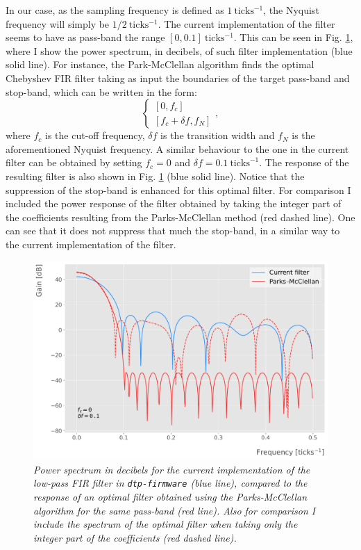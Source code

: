 In our case, as the sampling frequency is defined as $1 \ \mathrm{ticks^{-1}}$, the Nyquist frequency will simply be $1/2 \ \mathrm{ticks^{-1}}$. The current implementation of the filter seems to have as pass-band the range $[0,0.1] \ \mathrm{ticks^{-1}}$. This can be seen in Fig. \ref{fig:filter_comp}, where I show the power spectrum, in decibels, of such filter implementation (blue solid line). For instance, the Park-McClellan algorithm finds the optimal Chebyshev FIR filter taking as input the boundaries of the target pass-band and stop-band, which can be written in the form:
\begin{equation}
	\left\{ \begin{array}{c}
		\left[0, f_{c}\right] \\
		\left[ f_{c} + \delta f, f_{N}\right]
	\end{array} \right. ,
\end{equation}
where $f_{c}$ is the cut-off frequency, $\delta f$ is the transition width and $f_{N}$ is the aforementioned Nyquist frequency. A similar behaviour to the one in the current filter can be obtained by setting $f_{c} = 0$ and $\delta f = 0.1 \ \mathrm{ticks}^{-1}$. The response of the resulting filter is also shown in Fig. \ref{fig:filter_comp} (blue solid line). Notice that the suppression of the stop-band is enhanced for this optimal filter. For comparison I included the power response of the filter obtained by taking the integer part of the coefficients resulting from the Parks-McClellan method (red dashed line). One can see that it 
does not suppress that much the stop-band, in a similar way to the current implementation of the filter.

\begin{figure}[h!]
	\centering
	\includegraphics[width=0.8\linewidth]{Images/Matched_Filter/filter_comp}
	\caption{\textit{Power spectrum in decibels for the current implementation of the low-pass FIR filter in \texttt{dtp-firmware} (blue line), compared to the response of an optimal filter obtained using the Parks-McClellan algorithm for the same pass-band (red line). Also for comparison I include the spectrum of the optimal filter when taking only the integer part of the coefficients (red dashed line).}}
	\label{fig:filter_comp}
\end{figure}

